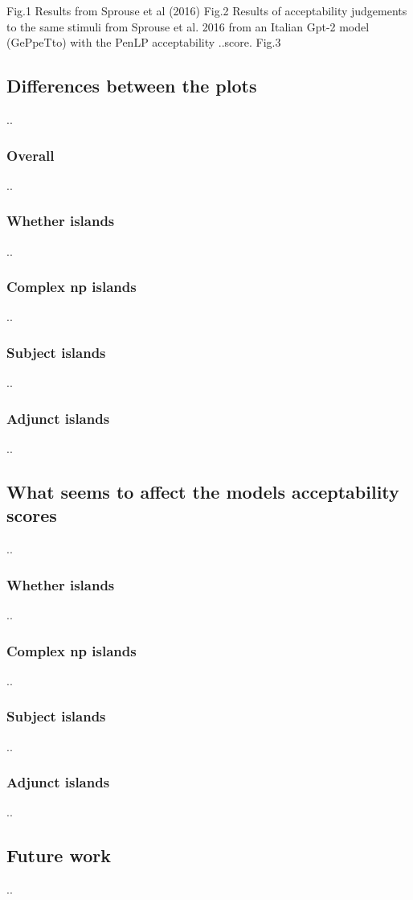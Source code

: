 Fig.1 Results from Sprouse et al (2016)
Fig.2 Results of acceptability judgements to the same stimuli from Sprouse et al. 2016 from an Italian Gpt-2 model (GePpeTto) with the PenLP acceptability ..score. 
Fig.3

\subsection{Differences between the plots}

..
\subsubsection{Overall}
..
\subsubsection{Whether islands}
..
\subsubsection{Complex np islands}
..
\subsubsection{Subject islands}
..
\subsubsection{Adjunct islands}
..

\subsection{What seems to affect the models acceptability scores}
..
\subsubsection{Whether islands}
..
\subsubsection{Complex np islands}
..
\subsubsection{Subject islands}
..
\subsubsection{Adjunct islands}
..

\subsection{Future work}
..

